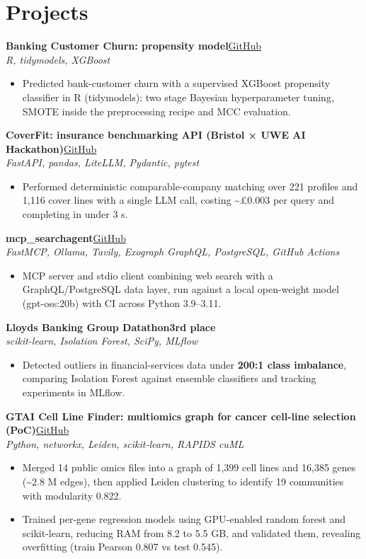 \documentclass[a4paper,11pt]{article}
\newcommand{\project}[3]{%
  \textbf{#1}\hfill#3\\
  {\color{muted}\small\textit{#2}}\par}
\newcommand{\gh}[1]{\href{#1}{\small GitHub}}
\newcommand{\badge}[1]{{\color{navy}\small\textbf{#1}}}
\newcommand{\gap}{\vspace{5pt}}
\newcommand{\num}[1]{\textbf{#1}}   %
\begin{document}
\section{Projects}
\project{Banking Customer Churn: propensity model}{R, tidymodels, XGBoost}{\gh{https://github.com/Thiruvel-AP/Banking-Customer-Churn-Prediction}}
\begin{itemize}
  \item Predicted bank-customer churn with a supervised XGBoost propensity classifier in R (tidymodels): two stage Bayesian hyperparameter tuning, SMOTE inside the preprocessing recipe and MCC evaluation.
\end{itemize}
\gap
{}
\project{CoverFit: insurance benchmarking API (Bristol × UWE AI Hackathon)}{FastAPI, pandas, LiteLLM, Pydantic, pytest}{\gh{https://github.com/Thiruvel-AP/AIHackathon-Phoenix}}
\begin{itemize}
  \item Performed deterministic comparable-company matching over 221 profiles and 1,116 cover lines with a single LLM call, costing \textasciitilde{}£0.003 per query and completing in under 3 s.
\end{itemize}
\gap
{}
\project{mcp\_searchagent}{FastMCP, Ollama, Tavily, Exograph GraphQL, PostgreSQL, GitHub Actions}{\gh{https://github.com/Thiruvel-AP/mcp_searchagent}}
\begin{itemize}
  \item MCP server and stdio client combining web search with a GraphQL/PostgreSQL data layer, run against a local open-weight model (gpt-oss:20b) with CI across Python 3.9–3.11.
\end{itemize}
\gap
{}
\project{Lloyd\textquotesingle{}s Banking Group Datathon}{scikit-learn, Isolation Forest, SciPy, MLflow}{\badge{3rd place}}
\begin{itemize}
  \item Detected outliers in financial-services data under \num{200:1 class imbalance}, comparing Isolation Forest against ensemble classifiers and tracking experiments in MLflow.
\end{itemize}
\gap
{}
\project{GTAI Cell Line Finder: multiomics graph for cancer cell-line selection (PoC)}{Python, networkx, Leiden, scikit-learn, RAPIDS cuML}{\gh{https://github.com/Thiruvel-AP/GTAI-GraphPOC}}
\begin{itemize}
  \item Merged 14 public omics files into a graph of 1,399 cell lines and 16,385 genes (\textasciitilde{}2.8 M edges), then applied Leiden clustering to identify 19 communities with modularity 0.822.
  \item Trained per-gene regression models using GPU-enabled random forest and scikit-learn, reducing RAM from 8.2 to 5.5 GB, and validated them, revealing overfitting (train Pearson 0.807 vs test 0.545).
\end{itemize}
\end{document}
